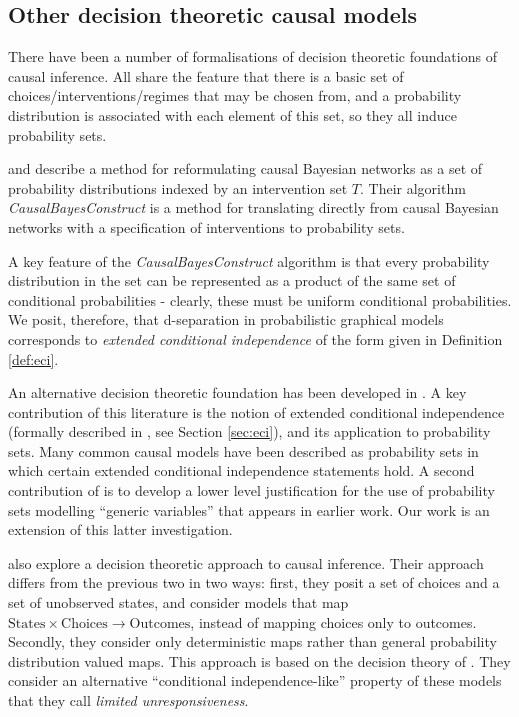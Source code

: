 \subsection{Other decision theoretic causal models}

There have been a number of formalisations of decision theoretic foundations of causal inference. All share the feature that there is a basic set of choices/interventions/regimes that may be chosen from, and a probability distribution is associated with each element of this set, so they all induce probability sets. 

\citet{lattimore_causal_2019} and \citet{lattimore_replacing_2019} describe a method for reformulating causal Bayesian networks as a set of probability distributions indexed by an intervention set $T$. Their algorithm \emph{CausalBayesConstruct} is a method for translating directly from causal Bayesian networks with a specification of interventions to probability sets.

A key feature of the \emph{CausalBayesConstruct} algorithm is that every probability distribution in the set can be represented as a product of the same set of conditional probabilities - clearly, these must be uniform conditional probabilities. We posit, therefore, that d-separation in probabilistic graphical models corresponds to \emph{extended conditional independence} of the form given in Definition \ref{def:eci}.

An alternative decision theoretic foundation has been developed in \citet{dawid_decision-theoretic_2020,dawid_beware_2010,dawid_causal_2000}. A key contribution of this literature is the notion of extended conditional independence (formally described in \citet{constantinou_extended_2017}, see Section \ref{sec:eci}), and its application to probability sets. Many common causal models have been described as probability sets in which certain extended conditional independence statements hold. A second contribution of \citet{dawid_decision-theoretic_2020} is to develop a lower level justification for the use of probability sets modelling ``generic variables'' that appears in earlier work. Our work is an extension of this latter investigation.

\citet{heckerman_decision-theoretic_1995} also explore a decision theoretic approach to causal inference. Their approach differs from the previous two in two ways: first, they posit a set of choices and a set of unobserved states, and consider models that map $\mathrm{States}\times\mathrm{Choices}\to \mathrm{Outcomes}$, instead of mapping choices only to outcomes. Secondly, they consider only deterministic maps rather than general probability distribution valued maps. This approach is based on the decision theory of \citet{savage_foundations_1954}. They consider an alternative ``conditional independence-like'' property of these models that they call \emph{limited unresponsiveness}.